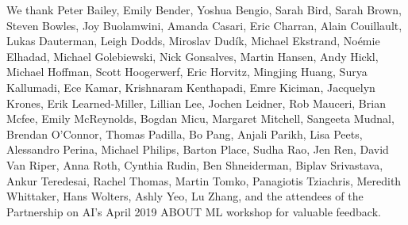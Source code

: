 We thank Peter Bailey, Emily Bender, Yoshua Bengio, Sarah Bird, Sarah Brown,
Steven Bowles, Joy Buolamwini, Amanda Casari, Eric Charran, Alain
Couillault, Lukas Dauterman, Leigh Dodds, Miroslav Dud\'{i}k, Michael
Ekstrand, No\'emie Elhadad, Michael Golebiewski, Nick Gonsalves,
Martin Hansen, Andy Hickl, Michael Hoffman, Scott Hoogerwerf, Eric
Horvitz, Mingjing Huang, Surya Kallumadi, Ece Kamar, Krishnaram
Kenthapadi, Emre Kiciman, Jacquelyn Krones, Erik Learned-Miller,
Lillian Lee, Jochen Leidner, Rob Mauceri, Brian Mcfee, Emily
McReynolds, Bogdan Micu, Margaret Mitchell, Sangeeta Mudnal, Brendan O'Connor, Thomas
Padilla, Bo Pang, Anjali Parikh, Lisa Peets, Alessandro Perina,
Michael Philips, Barton Place, Sudha Rao, Jen Ren, David Van Riper, Anna Roth,
Cynthia Rudin, Ben Shneiderman, Biplav Srivastava, Ankur Teredesai,
Rachel Thomas, Martin Tomko, Panagiotis Tziachris, Meredith Whittaker,
Hans Wolters, Ashly Yeo, Lu Zhang, and the attendees of the
Partnership on AI's April 2019 ABOUT ML workshop for valuable
feedback.
